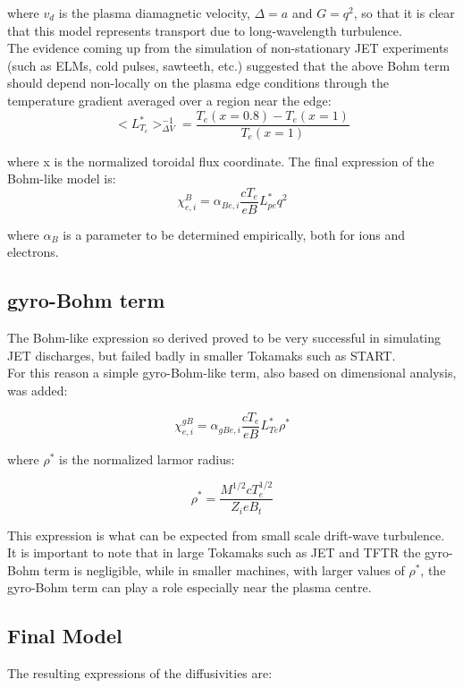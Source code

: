 where $v_d$ is the plasma diamagnetic velocity, $\Delta=a$ and $G=q^2$,
so that it is clear that this model represents transport due to 
long-wavelength turbulence.\\
The evidence coming up from the simulation of non-stationary
JET experiments \cite{erb97}(such as ELMs, cold pulses, sawteeth, etc.)
suggested that the above Bohm term should depend non-locally
on the plasma edge conditions through the temperature
gradient averaged over a region near the edge:\\

\[ <L_{T_e}^*>_{\Delta V}^{-1} = \frac{T_e(x=0.8) - T_e(x=1)}{T_e(x=1)}\]

where x is the normalized toroidal flux coordinate. The final
expression of the Bohm-like model is:\\

\[ \chi_{e,i}^B = \alpha_{Be,i} \frac{cT_e}{eB} L_{pe}^* q^2\]

where $\alpha_B$ is a parameter to be determined empirically,
both for ions and electrons.\\ 

\subsection{gyro-Bohm term}

The Bohm-like expression so derived proved to be very successful
in simulating JET discharges, but failed badly in smaller Tokamaks
such as START\cite{roa96}.\\
For this reason a simple gyro-Bohm-like term, also based on 
dimensional analysis, was added:

\[ \chi_{e,i}^{gB} = \alpha_{gBe,i} \frac{cT_e}{eB} L_{Te}^* \rho^*\]

where $\rho^*$ is the normalized larmor radius:

\[ \rho^* =  \frac {M^{1/2}cT_e^{1/2}}{Z_ieB_t}\]

This expression is what can be expected from small scale
drift-wave turbulence. It is important to note that in large
Tokamaks such as JET and TFTR the gyro-Bohm term is negligible,
while in smaller machines, with larger values of $\rho^*$, the
gyro-Bohm term can play a role especially near the plasma centre.\\ 

\subsection{Final Model}
The resulting expressions of the diffusivities are:

